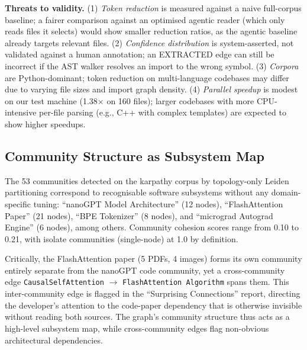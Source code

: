 \textbf{Threats to validity.} (1) \emph{Token reduction} is measured against a
naive full-corpus baseline; a fairer comparison against an optimised agentic
reader (which only reads files it selects) would show smaller reduction ratios,
as the agentic baseline already targets relevant files. (2) \emph{Confidence
distribution} is system-asserted, not validated against a human annotation; an
EXTRACTED edge can still be incorrect if the AST walker resolves an import to the
wrong symbol. (3) \emph{Corpora} are Python-dominant; token reduction on
multi-language codebases may differ due to varying file sizes and import
graph density. (4) \emph{Parallel speedup} is modest on our test machine (1.38$\times$
on 160 files); larger codebases with more CPU-intensive per-file parsing (e.g.,
C++ with complex templates) are expected to show higher speedups.


\subsection{Community Structure as Subsystem Map}

The 53 communities detected on the karpathy corpus by topology-only Leiden
partitioning correspond to recognisable software subsystems without any
domain-specific tuning: ``nanoGPT Model Architecture'' (12 nodes), ``FlashAttention
Paper'' (21 nodes), ``BPE Tokenizer'' (8 nodes), and ``micrograd Autograd
Engine'' (6 nodes), among others. Community cohesion scores range from 0.10
to 0.21, with isolate communities (single-node) at 1.0 by definition.

Critically, the FlashAttention paper (5 PDFs, 4 images) forms its own community
entirely separate from the nanoGPT code community, yet a cross-community edge
\texttt{CausalSelfAttention} $\rightarrow$ \texttt{FlashAttention Algorithm}
spans them. This inter-community edge is flagged in the ``Surprising Connections''
report, directing the developer's attention to the code-paper dependency that
is otherwise invisible without reading both sources. The graph's community
structure thus acts as a high-level subsystem map, while cross-community edges
flag non-obvious architectural dependencies.
